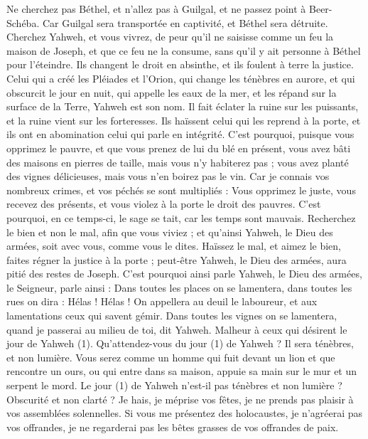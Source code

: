 \begin{multicols}{2}
Ne cherchez pas Béthel, et n'allez pas à Guilgal, et ne passez point à Beer-Schéba. Car Guilgal sera transportée en captivité, et Béthel sera détruite.
Cherchez Yahweh, et vous vivrez, de peur qu'il ne saisisse comme un feu la maison de Joseph, et que ce feu ne la consume, sans qu'il y ait personne à Béthel pour l’éteindre.
Ils changent le droit en absinthe, et ils foulent à terre la justice.
Celui qui a créé les Pléiades et l'Orion, qui change les ténèbres en aurore, et qui obscurcit le jour en nuit, qui appelle les eaux de la mer, et les répand sur la surface de la Terre, Yahweh est son nom.
Il fait éclater la ruine sur les puissants, et la ruine vient sur les forteresses.
Ils haïssent celui qui les reprend à la porte, et ils ont en abomination celui qui parle en intégrité.
C'est pourquoi, puisque vous opprimez le pauvre, et que vous prenez de lui du blé en présent, vous avez bâti des maisons en pierres de taille, mais vous n'y habiterez pas ; vous avez planté des vignes délicieuses, mais vous n'en boirez pas le vin.
Car je connais vos nombreux crimes, et vos péchés se sont multipliés : Vous opprimez le juste, vous recevez des présents, et vous violez à la porte le droit des pauvres.
C'est pourquoi, en ce temps-ci, le sage se tait, car les temps sont mauvais.
Recherchez le bien et non le mal, afin que vous viviez ; et qu’ainsi Yahweh, le Dieu des armées, soit avec vous, comme vous le dites.
Haïssez le mal, et aimez le bien, faites régner la justice à la porte ; peut-être Yahweh, le Dieu des armées, aura pitié des restes de Joseph.
C'est pourquoi ainsi parle Yahweh, le Dieu des armées, le Seigneur, parle ainsi : Dans toutes les places on se lamentera, dans toutes les rues on dira : Hélas ! Hélas ! On appellera au deuil le laboureur, et aux lamentations ceux qui savent gémir.
Dans toutes les vignes on se lamentera, quand je passerai au milieu de toi, dit Yahweh.
Malheur à ceux qui désirent le jour de Yahweh (1). Qu’attendez-vous du jour (1) de Yahweh ? Il sera ténèbres, et non lumière.
Vous serez comme un homme qui fuit devant un lion et que rencontre un ours, ou qui entre dans sa maison, appuie sa main sur le mur et un serpent le mord.
Le jour (1) de Yahweh n’est-il pas ténèbres et non lumière ? Obscurité et non clarté ?
Je hais, je méprise vos fêtes, je ne prends pas plaisir à vos assemblées solennelles.
Si vous me présentez des holocaustes, je n’agréerai pas vos offrandes, je ne regarderai pas les bêtes grasses de vos offrandes de paix.

\end{multicols}
